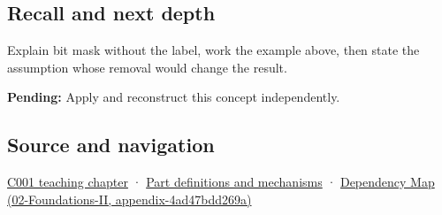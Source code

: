 \subsection{Recall and next depth}\label{recall-and-next-depth}

Explain bit mask without the label, work the example above, then state the assumption whose removal would change the result.

\textbf{Pending:} Apply and reconstruct this concept independently.

\subsection{Source and navigation}\label{source-and-navigation}

\href{Continuous\%20Notes/Computing\%20Foundations\%20-\%20From\%20Bits\%20to\%20C++\%20and\%20Systems\%20APIs\#From\%20a\%20signal\%20to\%20an\%20interpretation}{C001 teaching chapter} · \hyperref[appendix-fd090d982a15]{Part definitions and mechanisms} · \href{}{Dependency Map (02-Foundations-II, appendix-4ad47bdd269a)}
